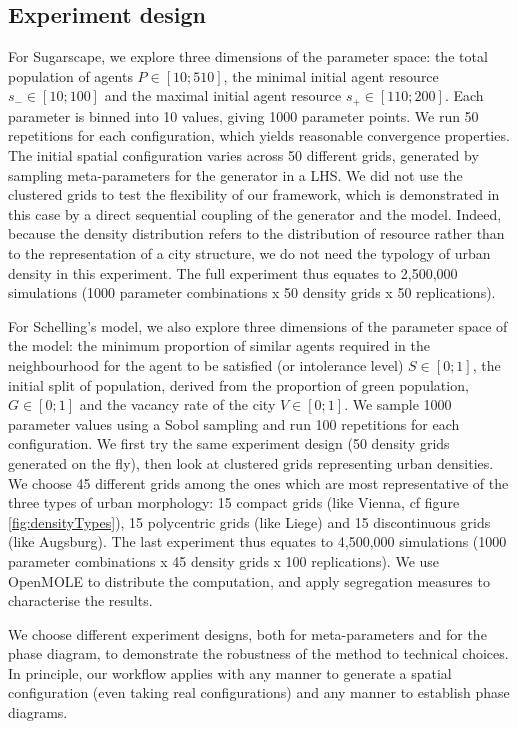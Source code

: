 \documentclass[3p,times,procedia]{elsarticle}
\begin{document}
\subsection{Experiment design}
For Sugarscape, we explore three dimensions of the parameter space: the total population of agents $P\in \left[10;510\right]$, the minimal initial agent resource $s_{-}\in \left[10;100\right]$ and the maximal initial agent resource $s_{+}\in \left[110;200\right]$. Each parameter is binned into 10 values, giving 1000 parameter points. We run 50 repetitions for each configuration, which yields reasonable convergence properties. The initial spatial configuration varies across 50 different grids, generated by sampling meta-parameters for the generator in a LHS. We did not use the clustered grids to test the flexibility of our framework, which is demonstrated in this case by a direct sequential coupling of the generator and the model. Indeed, because the density distribution refers to the distribution of resource rather than to the representation of a city structure, we do not need the typology of urban density in this experiment. The full experiment thus equates to 2,500,000 simulations (1000 parameter combinations x 50 density grids x 50 replications). 

For Schelling's model, we also explore three dimensions of the parameter space of the model: the minimum proportion of similar agents required in the neighbourhood for the agent to be satisfied (or intolerance level) $S\in \left[0;1\right]$, the initial split of population, derived from the proportion of green population, $G\in \left[0;1\right]$ and the vacancy rate of the city $V\in \left[0;1\right]$. We sample 1000 parameter values using a Sobol sampling and run 100 repetitions for each configuration. We first try the same experiment design (50 density grids generated on the fly), then look at clustered grids representing urban densities. We choose 45 different grids among the ones which are most representative of the three types of urban morphology: 15 compact grids (like Vienna, cf figure \ref{fig:densityTypes}), 15 polycentric grids (like Liege) and 15 discontinuous grids (like Augsburg). The last experiment thus equates to 4,500,000 simulations (1000 parameter combinations x 45 density grids x 100 replications). We use OpenMOLE to distribute the computation, and apply segregation measures to characterise the results.



We choose different experiment designs, both for meta-parameters and for the phase diagram, to demonstrate the robustness of the method to technical choices. In principle, our workflow applies with any manner to generate a spatial configuration (even taking real configurations) and any manner to establish phase diagrams.
\end{document}
